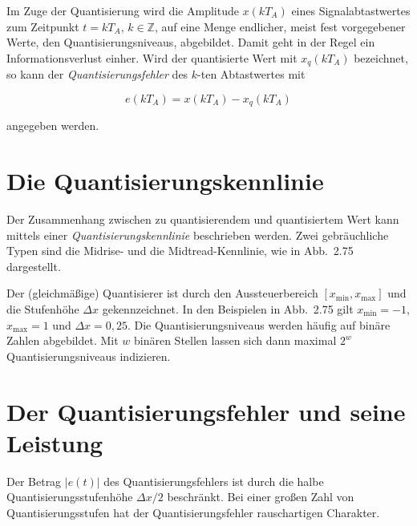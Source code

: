 \begin{definition}
Im Zuge der Quantisierung wird die Amplitude $x(kT_A)$ eines Signalabtastwertes zum Zeitpunkt $t = kT_A$, $k \in \mathbb{Z}$, auf eine Menge endlicher, meist fest vorgegebener Werte, den Quantisierungsniveaus, abgebildet. Damit geht in der Regel ein Informationsverlust einher. Wird der quantisierte Wert mit $x_q(kT_A)$ bezeichnet, so kann der \textit{Quantisierungsfehler} des $k$-ten Abtastwertes mit

$$
e(kT_A) = x(kT_A) - x_q(kT_A)
$$

angegeben werden.
\end{definition}


\section{Die Quantisierungskennlinie}
\label{sec:quantisierungskennlinie}

Der Zusammenhang zwischen zu quantisierendem und quantisiertem Wert kann mittels einer \textit{Quantisierungskennlinie} beschrieben werden. Zwei gebräuchliche Typen sind die Midrise- und die Midtread-Kennlinie, wie in Abb.\ 2.75 dargestellt.

Der (gleichmäßige) Quantisierer ist durch den Aussteuerbereich $[x_{\min}, x_{\max}]$ und die Stufenhöhe $\Delta x$ gekennzeichnet. In den Beispielen in Abb.\ 2.75 gilt $x_{\min} = -1$, $x_{\max} = 1$ und $\Delta x = 0{,}25$. Die Quantisierungsniveaus werden häufig auf binäre Zahlen abgebildet. Mit $w$ binären Stellen lassen sich dann maximal $2^w$ Quantisierungsniveaus indizieren.


\section{Der Quantisierungsfehler und seine Leistung}
\label{sec:quantisierungsfehler}

Der Betrag $|e(t)|$ des Quantisierungsfehlers ist durch die halbe Quantisierungsstufenhöhe $\Delta x / 2$ beschränkt. Bei einer großen Zahl von Quantisierungsstufen hat der Quantisierungsfehler rauschartigen Charakter.

